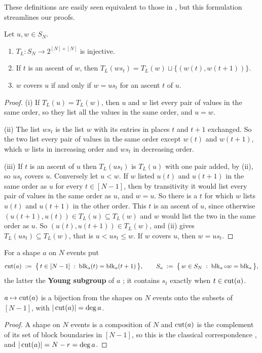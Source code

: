 \documentclass[11pt]{article}
\begin{document}
These definitions are easily seen equivalent to those in \cite{BB}, but this formulation
streamlines our proofs.
\begin{lemma}\label{lem:weak}
  Let $u, w \in S_N$.
  \begin{enumerate}[label=(\roman*)]
    \item $T_L : S_N \to 2^{[N] \times [N]}$ is injective.
    \item If $t$ is an ascent of $w$, then $T_L(ws_t) = T_L(w) \sqcup \bigl\{(w(t), w(t+1))\bigr\}$.
    \item $w$ covers $u$ if and only if $w = us_t$ for an ascent $t$ of $u$.
  \end{enumerate}
\end{lemma}
\begin{proof}
  (i) If $T_L(u) = T_L(w)$, then $u$ and $w$ list every pair of values in the same order, so they
  list all the values in the same order, and $u = w$.

  (ii) The list $ws_t$ is the list $w$ with its entries in places $t$ and $t+1$ exchanged. So the
  two list every pair of values in the same order except $w(t)$ and $w(t+1)$, which $w$ lists in
  increasing order and $ws_t$ in decreasing order.

  (iii) If $t$ is an ascent of $u$ then $T_L(us_t)$ is $T_L(u)$ with one pair added, by (ii), so
  $us_t$ covers $u$. Conversely let $u < w$. If $w$ listed $u(t)$ and $u(t+1)$ in the same order as
  $u$ for every $t \in [N-1]$, then by transitivity it would list every pair of values in the same
  order as $u$, and $w = u$. So there is a $t$ for which $w$ lists $u(t)$ and $u(t+1)$ in the other
  order. This $t$ is an ascent of $u$, since otherwise $(u(t+1), u(t)) \in T_L(u) \subseteq T_L(w)$
  and $w$ would list the two in the same order as $u$. So $(u(t), u(t+1)) \in T_L(w)$, and (ii)
  gives $T_L(us_t) \subseteq T_L(w)$, that is $u < us_t \le w$. If $w$ covers $u$, then
  $w = us_t$.
\end{proof}

For a shape $a$ on $N$ events put
\[
  \operatorname{cut}(a) \;:=\; \bigl\{\, t \in [N-1] \;:\; \operatorname{blk}_a(t) = \operatorname{blk}_a(t+1) \,\bigr\} , \qquad
  S_a \;:=\; \bigl\{\, w \in S_N \;:\; \operatorname{blk}_a \circ w = \operatorname{blk}_a \,\bigr\} ,
\]
the latter the \textbf{Young subgroup} of $a$ \cite[\S2.4]{BB}; it contains $s_t$ exactly when
$t \in \operatorname{cut}(a)$.

\begin{lemma}\label{lem:cuts}
  $a \mapsto \operatorname{cut}(a)$ is a bijection from the shapes on $N$ events onto the subsets of $[N-1]$,
  with $|\operatorname{cut}(a)| = \deg a$.
\end{lemma}
\begin{proof}
  A shape on $N$ events is a composition of $N$ and $\operatorname{cut}(a)$ is the complement of its set of block
  boundaries in $[N-1]$, so this is the classical correspondence \cite[\S1.2]{EC1}, and
  $|\operatorname{cut}(a)| = N - r = \deg a$.
\end{proof}
\end{document}
